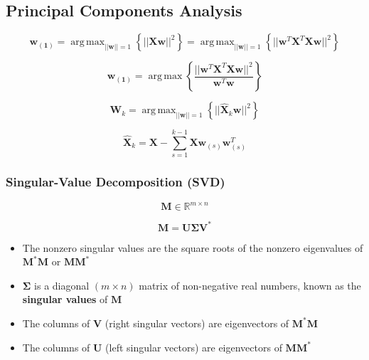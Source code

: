 \documentclass[a4paper]{article}
\DeclareMathOperator*{\argmax}{arg\,max}
\begin{document}
\subsection{Principal Components Analysis}

$$ \mathbf{w_{(1)}} = \argmax_{||\mathbf{w}||=1}\left\{ ||\mathbf{Xw}||^2 \right\} = \argmax_{||\mathbf{w}||=1}\left\{ ||\mathbf{w}^T\mathbf{X}^T\mathbf{Xw}||^2 \right\}$$

$$ \mathbf{w_{(1)}}=\argmax\left\{\frac{||\mathbf{w}^T\mathbf{X}^T\mathbf{Xw}||^2}{\mathbf{w}^T\mathbf{w}}\right\}$$

$$ \mathbf{W}_k = \argmax_{||\mathbf{w}||=1}\left\{ ||\mathbf{\hat{X}}_k\mathbf{w}||^2 \right\} $$

$$ \mathbf{\hat{X}}_k = \mathbf{X}-\sum_{s=1}^{k-1}\mathbf{Xw}_{(s)}\mathbf{w}_{(s)}^T $$

\subsubsection{Singular-Value Decomposition (SVD)}

$$ \mathbf{M} \in \mathbb{R}^{m \times n}$$

$$ \mathbf{M} = \mathbf{U\Sigma V}^* $$

\begin{itemize}
  \item The nonzero singular values are the square roots of the nonzero eigenvalues of $\mathbf{M}^*\mathbf{M}$ or $\mathbf{MM}^*$
  \item $\mathbf{\Sigma}$ is a diagonal $(m \times n)$ matrix of non-negative real numbers, known as the \textbf{singular values} of $\mathbf{M}$
  \item The columns of $\mathbf{V}$ (right singular vectors) are eigenvectors of $\mathbf{M}^*\mathbf{M}$
  \item The columns of $\mathbf{U}$ (left singular vectors) are eigenvectors of $\mathbf{MM}^*$
\end{itemize}
\end{document}
